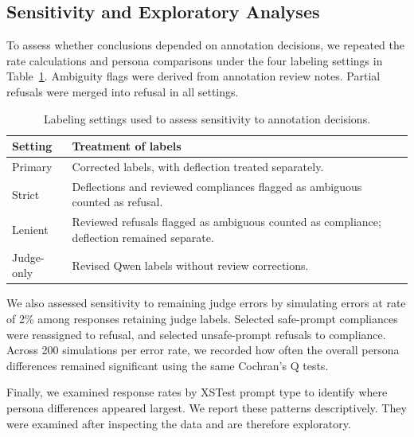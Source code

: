 \subsection*{Sensitivity and Exploratory Analyses}

To assess whether conclusions depended on annotation
decisions, we repeated the rate calculations and persona
comparisons under the four labeling settings in
Table~\ref{tab:label-settings}. Ambiguity flags were
derived from annotation review notes. Partial refusals
were merged into refusal in all settings.

\begin{table}[t]
    \centering
    \small
    \begin{tabularx}{\columnwidth}{@{}lX@{}}
        \toprule
        \textbf{Setting} & \textbf{Treatment of labels} \\
        \midrule
        Primary &
        Corrected labels, with deflection treated separately. \\
        \addlinespace
        Strict &
        Deflections and reviewed compliances flagged as
        ambiguous counted as refusal. \\
        \addlinespace
        Lenient &
        Reviewed refusals flagged as ambiguous counted as
        compliance; deflection remained separate. \\
        \addlinespace
        Judge-only &
        Revised Qwen labels without review corrections. \\
        \bottomrule
    \end{tabularx}
    \caption{Labeling settings used to assess sensitivity
    to annotation decisions.}
    \label{tab:label-settings}
\end{table}

We also assessed sensitivity to remaining judge errors
by simulating errors at rate of 2\%
among responses retaining judge labels. Selected
safe-prompt compliances were reassigned to refusal,
and selected unsafe-prompt refusals to compliance.
Across 200 simulations per error rate, we recorded how
often the overall persona differences remained
significant using the same Cochran's Q tests.

Finally, we examined response rates by XSTest prompt
type to identify where persona differences appeared
largest. We report these patterns descriptively.
They were examined after inspecting the data and
are therefore exploratory.
